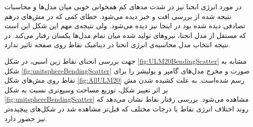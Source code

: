 در مورد انرژی انحنا نیز در شد‌ت مدهای کم همخوانی خوبی میان مدل‌ها و محاسبات نتیجه شده از بررسی افت و خیز دیده می‌شود. خطای کمی که در مش‌های درهم تصادفی دیده‌ شده بود در اینجا نیز دیده می‌شود. ولی نتیجه‌ی مهم این شکل این است که مستقل از مدل انحنا، نیروهای تولید شده میان تمام مدل‌ها یکسان رفتار می‌کند. در نتیجه انتخاب مدل محاسبه‌ی انرژی انحنا در دینامیک نقاط روی صفحه تاثیر ندارد.



جهت بررسی انحنای نقاط زین اسبی، در شکل 
\ref{fig:ULM20BendingScatter}
مشابه به شکل
\ref{fig:unitsphereBendingScatter}
صورت و مخرج مدل‌های گامپر و یولیشر را برای نقاط روی مش‌های شکل 
\ref{fig:AllULM20}
رسم شده‌است. به علت کشیده شدن مش‌ بر اثر تغییر شکل، توزیع مساحت وسیع‌تری نسبت به شکل 
\ref{fig:unitsphereBendingScatter}
مشاهده می‌شود. بررسی رفتار نقاط نشان می‌دهد که روند اختلاف انرژی نقاط با درجات مختلف که قبل‌تر مشاهده شد در شکل‌های پیچیده‌تر نیز حضور دارد.




